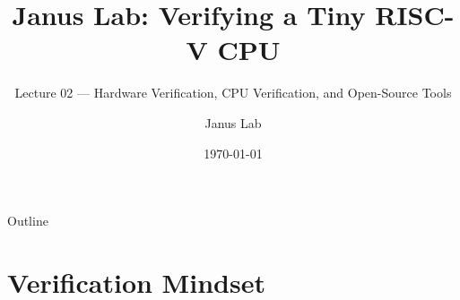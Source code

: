 \documentclass[aspectratio=169,10pt]{beamer}
\title[Janus Lab -- CPU Verification]{Janus Lab: Verifying a Tiny RISC-V CPU}
\subtitle{Lecture 02 --- Hardware Verification, CPU Verification, and Open-Source Tools}
\author{Janus Lab}
\date{\today}
\institute{CPU Design and Implementation}
\begin{document}

\begin{frame}
  \titlepage
\end{frame}

\begin{frame}{Outline}
  \tableofcontents
\end{frame}

\section{Verification Mindset}
\end{document}
